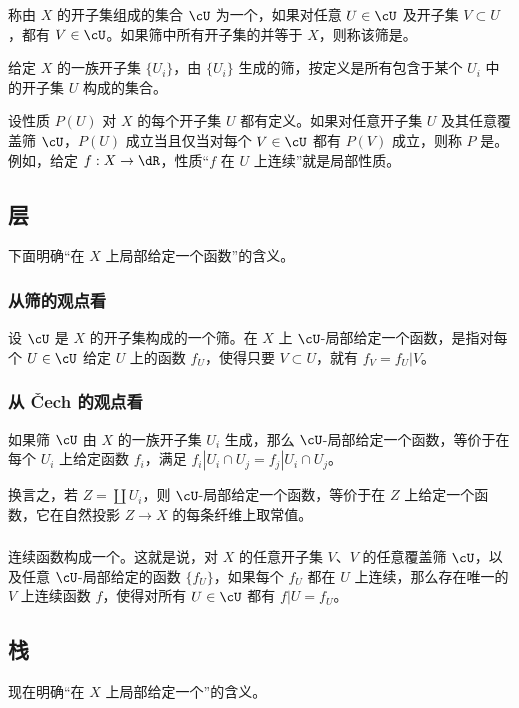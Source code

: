 称由 $X$ 的开子集组成的集合 $\cU$ 为一个，如果对任意 $U\in\cU$ 及开子集 $V\subset U$，都有 $V\in\cU$。如果筛中所有开子集的并等于 $X$，则称该筛是。

给定 $X$ 的一族开子集 $\{U_i\}$，由 $\{U_i\}$ 生成的筛，按定义是所有包含于某个 $U_i$ 中的开子集 $U$ 构成的集合。

设性质 $P(U)$ 对 $X$ 的每个开子集 $U$ 都有定义。如果对任意开子集 $U$ 及其任意覆盖筛 $\cU$，$P(U)$ 成立当且仅当对每个 $V\in\cU$ 都有 $P(V)$ 成立，则称 $P$ 是。例如，给定 $f:X\to\dR$，性质“$f$ 在 $U$ 上连续”就是局部性质。

\subsection{层}\label{I:1-2}
下面明确“在 $X$ 上局部给定一个函数”的含义。

\subsubsection{从筛的观点看}\label{I:1-2-1}
设 $\cU$ 是 $X$ 的开子集构成的一个筛。在 $X$ 上 $\cU$-局部给定一个函数，是指对每个 $U\in\cU$ 给定 $U$ 上的函数 $f_U$，使得只要 $V\subset U$，就有 $f_V=f_U|V$。

\subsubsection{从 Čech 的观点看}\label{I:1-2-2}
如果筛 $\cU$ 由 $X$ 的一族开子集 $U_i$ 生成，那么 $\cU$-局部给定一个函数，等价于在每个 $U_i$ 上给定函数 $f_i$，满足
$f_i|{U_i\cap U_j}=f_j|{U_i\cap U_j}$。

换言之，若 $Z=\coprod U_i$，则 $\cU$-局部给定一个函数，等价于在 $Z$ 上给定一个函数，它在自然投影 $Z\to X$ 的每条纤维上取常值。

\subsubsection{}\label{I:1-2-3}
连续函数构成一个。这就是说，对 $X$ 的任意开子集 $V$、$V$ 的任意覆盖筛 $\cU$，以及任意 $\cU$-局部给定的函数 $\{f_U\}$，如果每个 $f_U$ 都在 $U$ 上连续，那么存在唯一的 $V$ 上连续函数 $f$，使得对所有 $U\in\cU$ 都有 $f|U=f_U$。

\subsection{栈}\label{I:1-3}
现在明确“在 $X$ 上局部给定一个”的含义。

